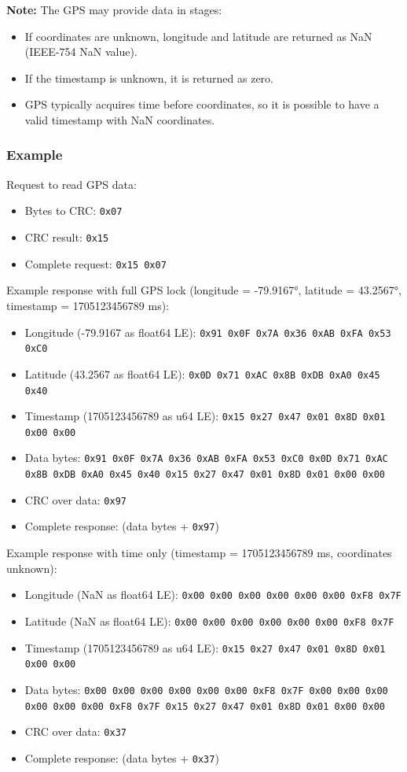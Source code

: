 \documentclass[12pt, titlepage]{article}
\begin{document}
\textbf{Note:} The GPS may provide data in stages:
\begin{itemize}
  \item If coordinates are unknown, longitude and latitude are returned as NaN
        (IEEE-754 NaN value).
  \item If the timestamp is unknown, it is returned as zero.
  \item GPS typically acquires time before coordinates, so it is possible to have a
        valid timestamp with NaN coordinates.
\end{itemize}

\subsubsection{Example}

Request to read GPS data:
\begin{itemize}
  \item Bytes to CRC: \texttt{0x07}
  \item CRC result: \texttt{0x15}
  \item Complete request: \texttt{0x15 0x07}
\end{itemize}

Example response with full GPS lock (longitude = -79.9167°, latitude =
43.2567°, timestamp = 1705123456789 ms):
\begin{itemize}
  \item Longitude (-79.9167 as float64 LE): \texttt{0x91 0x0F 0x7A 0x36 0xAB 0xFA 0x53
          0xC0}
  \item Latitude (43.2567 as float64 LE): \texttt{0x0D 0x71 0xAC 0x8B 0xDB 0xA0 0x45
          0x40}
  \item Timestamp (1705123456789 as u64 LE): \texttt{0x15 0x27 0x47 0x01 0x8D 0x01 0x00
          0x00}
  \item Data bytes: \texttt{0x91 0x0F 0x7A 0x36 0xAB 0xFA 0x53 0xC0 0x0D 0x71 0xAC 0x8B
          0xDB 0xA0 0x45 0x40 0x15 0x27 0x47 0x01 0x8D 0x01 0x00 0x00}
  \item CRC over data: \texttt{0x97}
  \item Complete response: (data bytes + \texttt{0x97})
\end{itemize}

Example response with time only (timestamp = 1705123456789 ms, coordinates
unknown):
\begin{itemize}
  \item Longitude (NaN as float64 LE): \texttt{0x00 0x00 0x00 0x00 0x00 0x00 0xF8 0x7F}
  \item Latitude (NaN as float64 LE): \texttt{0x00 0x00 0x00 0x00 0x00 0x00 0xF8 0x7F}
  \item Timestamp (1705123456789 as u64 LE): \texttt{0x15 0x27 0x47 0x01 0x8D 0x01 0x00
          0x00}
  \item Data bytes: \texttt{0x00 0x00 0x00 0x00 0x00 0x00 0xF8 0x7F 0x00 0x00 0x00 0x00
          0x00 0x00 0xF8 0x7F 0x15 0x27 0x47 0x01 0x8D 0x01 0x00 0x00}
  \item CRC over data: \texttt{0x37}
  \item Complete response: (data bytes + \texttt{0x37})
\end{itemize}
\end{document}
